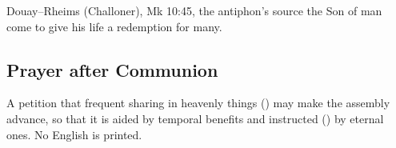 \begin{englishwitness}{Douay--Rheims (Challoner), Mk 10:45, the antiphon's source}
 the Son of man  come  to give his life a redemption for many.
\end{englishwitness}

\subsection{Prayer after Communion}
\label{proper-prayer-after-communion}


\noindent A petition that frequent sharing in heavenly things
() may make the assembly advance, so
that it is aided by temporal benefits and instructed () by
eternal ones. No English is printed.

